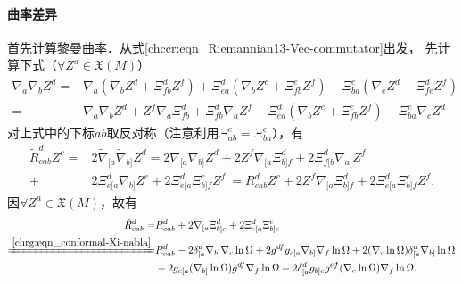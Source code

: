 \paragraph{曲率差异}
首先计算黎曼曲率．从式\eqref{chccr:eqn_Riemannian13-Vec-commutator}出发，
先计算下式（$\forall Z^a\in \mathfrak{X}(M)$）
\begin{align*}
    \tilde{\nabla}_a \tilde{\nabla}_b Z^d %
    =&{\nabla}_a (\nabla_b Z^d + \Xi_{fb}^d Z^f ) + \Xi_{ea}^d (\nabla_b Z^e + \Xi_{fb}^e Z^f )
    - \Xi_{ba}^e (\nabla_e Z^d + \Xi_{fe}^d Z^f ) \\
    =&{\nabla}_a \nabla_b Z^d + Z^f {\nabla}_a \Xi_{fb}^d   +\Xi_{fb}^d {\nabla}_a  Z^f +
       \Xi_{ea}^d (\nabla_b Z^e + \Xi_{fb}^e Z^f ) - \Xi_{ba}^e \tilde{\nabla}_e Z^d
\end{align*}
对上式中的下标$ab$取反对称（注意利用$\Xi_{ab}^c=\Xi_{ba}^c$），有
\begin{align*}
    \tilde{R}_{cab}^d Z^c =& 2 \tilde{\nabla}_{[a} \tilde{\nabla}_{b]} Z^d
    =2 {\nabla}_{[a} \nabla_{b]} Z^d + 2Z^f {\nabla}_{[a} \Xi_{b]f}^d  
    +2\Xi_{f[b}^d {\nabla}_{a]} Z^f \\
    +&2\Xi_{e[a}^d \nabla_{b]} Z^e + 2\Xi_{e[a}^d\Xi_{b]f}^e Z^f  
    \ =R_{cab}^d Z^c + 2Z^f {\nabla}_{[a} \Xi_{b]f}^d  + 2\Xi_{e[a}^d\Xi_{b]f}^e Z^f .
\end{align*} %
因$\forall Z^a\in \mathfrak{X}(M)$，故有
\begin{subequations}\label{chrg:eqn_conformal-Riemann}
\begin{align}
    \tilde{R}_{cab}^d=& R_{cab}^d + 2 {\nabla}_{[a} \Xi_{b]c}^d  + 2\Xi_{e[a}^d\Xi_{b]c}^e
    \label{chrg:eqn_conformal-Riemann-a}\\
    \xlongequal{\ref{chrg:eqn_conformal-Xi-nabla}}& R_{cab}^d -2\delta_{[a}^d{\nabla}_{b]}  \nabla_c \ln \Omega
    + 2{g}^{df} {g}_{c[a} {\nabla}_{b]} \nabla_f \ln\Omega
    + 2(\nabla_c \ln\Omega) \delta_{[a}^d\nabla_{b]} \ln\Omega  \notag \\
    &- 2 {g}_{c[a} (\nabla_{b]} \ln \Omega)  {g}^{df}\nabla_f \ln\Omega
    - 2\delta_{[a}^d {g}_{b]c} {g}^{ef}(\nabla_e \ln\Omega)\nabla_f \ln\Omega .
    \label{chrg:eqn_conformal-Riemann-c}
\end{align}
\end{subequations}
